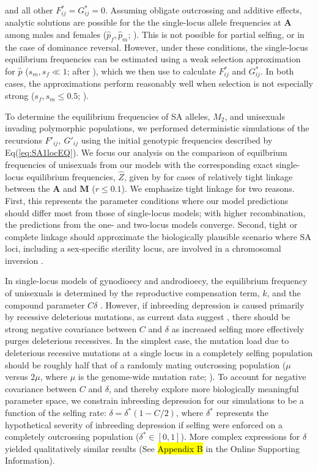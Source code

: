 \documentclass[9pt,twocolumn,twoside,lineno]{gsajnl}
\begin{document}
\noindent and all other $F^{\ast}_{ij} = G^{\ast}_{ij} =0$. Assuming obligate outcrossing and additive effects, analytic solutions are possible for the the single-locus allele frequencies at $\mathbf{A}$ among males and females ($\hat{p}_f,\hat{p}_m$; \citealt{Kidwell1977}). This is not possible for partial selfing, or in the case of dominance reversal. However, under these conditions, the single-locus equilibrium frequencies can be estimated using a weak selection approximation for $\hat{p}$ ($s_m,s_f \ll 1$; after \citealt{JordanConnallon2014}), which we then use to calculate $F^{\ast}_{ij}$ and $G^{\ast}_{ij}$. In both cases, the approximations perform reasonably well when selection is not especially strong ($s_f,s_m \leq 0.5$; \citealt{JordanConnallon2014,Olito2017}). 

To determine the equilibrium frequencies of SA alleles, $M_2$, and unisexuals invading polymorphic populations, we performed deterministic simulations of the recursions $F'_{ij},~G'_{ij}$ using the initial genotypic frequencies described by Eq(\ref{eq:SA1locEQ}). We focus our analysis on the comparison of equilbrium frequencies of unisexuals from our models with the corresponding exact single-locus equilibrium frequencies, $\hat{Z}$, given by \citet{Charlesworth1978a} for cases of relatively tight linkage between the $\mathbf{A}$ and $\mathbf{M}$ ($r\leq 0.1$). We emphasize tight linkage for two reasons. First, this represents the parameter conditions where our model predictions should differ most from those of single-locus models; with higher recombination, the predictions from the one- and two-locus models converge. Second, tight or complete linkage should approximate the biologically plausible scenario where SA loci, including a sex-specific sterility locus, are involved in a chromosomal inversion \citep{LeeKelly2015}.

In single-locus models of gynodioecy and androdioecy, the equilibrium frequency of unisexuals is determined by the reproductive compensation term, $k$, and the compound parameter $C \delta$ \citep{Charlesworth1978a}. However, if inbreeding depression is caused primarily by recessive deleterious mutations, as current data suggest \citep{Charlesworth2009}, there should be strong negative covariance between $C$ and $\delta$ as increased selfing more effectively purges deleterious recessives. In the simplest case, the mutation load due to deleterious recessive mutations at a single locus in a completely selfing population should be roughly half that of a randomly mating outcrossing population ($\mu$ versus $2 \mu$, where $\mu$ is the genome-wide mutation rate; \citealt{OhtaCockerham1974}). To account for negative covariance between $C$ and $\delta$, and thereby explore more biologically meaningful parameter space, we constrain inbreeding depression for our simulations to be a function of the selfing rate: $\delta = \delta^\ast(1 - C/2)$, where $\delta^\ast$ represents the hypothetical severity of inbreeding depression if selfing were enforced on a completely outcrossing population ($\delta^\ast \in [0,1]$). More complex expressions for $\delta$ yielded qualitatively similar results (See \hl{Appendix B} in the Online Supporting Information). 
\end{document}
